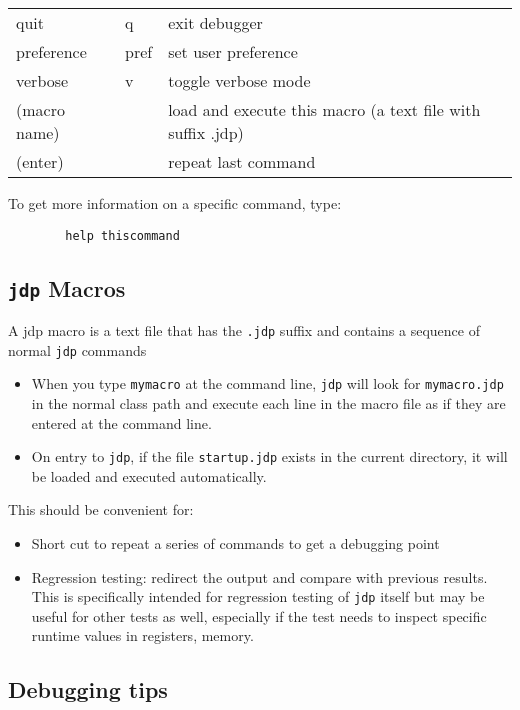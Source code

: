 \begin{tabular}{|l|l|l|}
quit          & q   & exit debugger                                             \\ 
preference    & pref & set user preference                                      \\ 
verbose       & v   & toggle verbose mode                                       \\ 
(macro name)  &   & load and execute this macro (a text file with suffix .jdp)  \\ 
(enter)       &   & repeat last command                                         \\ \hline 
\end{tabular}

To get more information on a specific command, type: 
\begin{verbatim}
        help thiscommand
\end{verbatim}


\subsection{ {\tt jdp} Macros}
A jdp macro is a text file that has the {\tt .jdp} suffix and contains a sequence of normal {\tt jdp} commands

\begin{itemize}
\item When you type {\tt mymacro} at the command line, {\tt jdp} will look for 
{\tt mymacro.jdp}
 in the normal class path and execute each line in the macro file as if 
 they are entered at the command line.
\item On entry to {\tt jdp}, if the file {\tt startup.jdp} exists in the current directory, 
 it will be loaded and executed automatically.
\end{itemize}

This should be convenient for:
\begin{itemize}
\item Short cut to repeat a series of commands to get a debugging point
\item Regression testing:  redirect the output and compare with previous 
 results.  This is specifically intended for regression testing of {\tt jdp} 
 itself but  may be useful for other tests as well, especially if the test 
 needs to inspect specific runtime values in registers, memory.
\end{itemize}

\subsection{Debugging tips}

